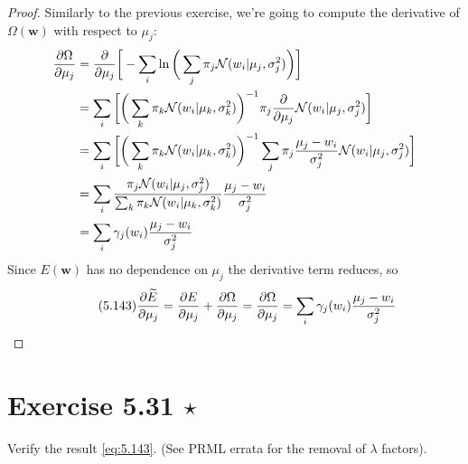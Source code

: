 \begin{proof}
    Similarly to the previous exercise, we're going to compute the derivative
    of $\Omega(\mathbf{w})$ with respect to $\mu_j$:
    \begin{align*}
        \pdv{\Omega}{\mu_j} 
        &= \pdv{\mu_j} \bigg[-\sum_{i}^{} \ln\bigg(\sum_{j}^{} \pi_j \mathcal{N}(w_i | \mu_j, \sigma_j^2)\bigg)\bigg] \\
        &= \sum_{i}^{} \bigg[\bigg(\sum_{k}^{} \pi_k \mathcal{N}(w_i | \mu_k, \sigma_k^2)\bigg)^{-1}
            \pi_j \pdv{\mu_j} \mathcal{N}(w_i | \mu_j, \sigma_j^2)\bigg] \\
        &= \sum_{i}^{} \bigg[\bigg(\sum_{k}^{} \pi_k \mathcal{N}(w_i | \mu_k, \sigma_k^2)\bigg)^{-1}
            \sum_{j}^{} \pi_j \frac{\mu_j - w_i}{\sigma_j^2} \mathcal{N}(w_i | \mu_j, \sigma_j^2)\bigg] \\
        &= \sum_{i}^{} \frac{\pi_j \mathcal{N}(w_i | \mu_j, \sigma_j^2)} 
            {\sum_{k}^{} \pi_k \mathcal{N}(w_i | \mu_k, \sigma_k^2)} \frac{\mu_j - w_i}{\sigma_j^2} \\
        &= \sum_{i}^{} \gamma_j(w_i) \frac{\mu_j - w_i}{\sigma_j^2}
    \end{align*}
    Since $E(\mathbf{w})$ has no dependence on $\mu_j$ the derivative term reduces, so
    \begin{equation}\label{eq:5.142}\tag{5.143}
        \pdv{\widetilde{E}}{\mu_j} = \pdv{E}{\mu_j} + \pdv{\Omega}{\mu_j}
        = \pdv{\Omega}{\mu_j}
        = \sum_{i}^{} \gamma_j(w_i) \frac{\mu_j - w_i}{\sigma_j^2}
    \end{equation}
\end{proof}

\section*{Exercise 5.31 $\star$}
Verify the result \eqref{eq:5.143}. (See PRML errata for the removal of $\lambda$ factors).

